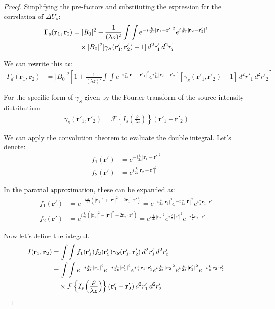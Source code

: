 \documentclass[10pt,a4paper]{amsart}
\begin{document}
\begin{proof}
Simplifying the pre-factors and substituting the expression for the correlation of $\Delta U_s$:
\begin{align}
\Gamma_d(\mathbf{r}_1, \mathbf{r}_2) &= |B_0|^2 + \frac{1}{(\lambda z)^2} \int\int e^{-i\frac{k}{2z}|\mathbf{r}_1 - \mathbf{r}'_1|^2} e^{i\frac{k}{2z}|\mathbf{r}_2 - \mathbf{r}'_2|^2} \\
&\quad \times |B_0|^2 [\gamma_S(\mathbf{r}'_1, \mathbf{r}'_2) - 1] \, d^2r'_1 \, d^2r'_2 \notag
\end{align}

We can rewrite this as:
\begin{align}
\Gamma_d(\mathbf{r}_1, \mathbf{r}_2) &= |B_0|^2 \left[1 + \frac{1}{(\lambda z)^2} \int\int e^{-i\frac{k}{2z}|\mathbf{r}_1 - \mathbf{r}'_1|^2} e^{i\frac{k}{2z}|\mathbf{r}_2 - \mathbf{r}'_2|^2} [\gamma_S(\mathbf{r}'_1, \mathbf{r}'_2) - 1] \, d^2r'_1 \, d^2r'_2 \right]
\end{align}

For the specific form of $\gamma_S$ given by the Fourier transform of the source intensity distribution:
\begin{align}
\gamma_S(\mathbf{r}'_1, \mathbf{r}'_2) = \mathcal{F}\left\{I_s\left(\frac{\mathbf{\rho}}{\lambda z}\right)\right\}(\mathbf{r}'_1 - \mathbf{r}'_2)
\end{align}

We can apply the convolution theorem to evaluate the double integral. Let's denote:
\begin{align}
f_1(\mathbf{r}') &= e^{-i\frac{k}{2z}|\mathbf{r}_1 - \mathbf{r}'|^2} \\
f_2(\mathbf{r}') &= e^{i\frac{k}{2z}|\mathbf{r}_2 - \mathbf{r}'|^2}
\end{align}

In the paraxial approximation, these can be expanded as:
\begin{align}
f_1(\mathbf{r}') &= e^{-i\frac{k}{2z}(|\mathbf{r}_1|^2 + |\mathbf{r}'|^2 - 2\mathbf{r}_1 \cdot \mathbf{r}')} = e^{-i\frac{k}{2z}|\mathbf{r}_1|^2} e^{-i\frac{k}{2z}|\mathbf{r}'|^2} e^{i\frac{k}{z}\mathbf{r}_1 \cdot \mathbf{r}'} \\
f_2(\mathbf{r}') &= e^{i\frac{k}{2z}(|\mathbf{r}_2|^2 + |\mathbf{r}'|^2 - 2\mathbf{r}_2 \cdot \mathbf{r}')} = e^{i\frac{k}{2z}|\mathbf{r}_2|^2} e^{i\frac{k}{2z}|\mathbf{r}'|^2} e^{-i\frac{k}{z}\mathbf{r}_2 \cdot \mathbf{r}'}
\end{align}

Now let's define the integral:
\begin{align}
I(\mathbf{r}_1, \mathbf{r}_2) &= \int\int f_1(\mathbf{r}'_1) f_2(\mathbf{r}'_2) \gamma_S(\mathbf{r}'_1, \mathbf{r}'_2) \, d^2r'_1 \, d^2r'_2 \\
&= \int\int e^{-i\frac{k}{2z}|\mathbf{r}_1|^2} e^{-i\frac{k}{2z}|\mathbf{r}'_1|^2} e^{i\frac{k}{z}\mathbf{r}_1 \cdot \mathbf{r}'_1} e^{i\frac{k}{2z}|\mathbf{r}_2|^2} e^{i\frac{k}{2z}|\mathbf{r}'_2|^2} e^{-i\frac{k}{z}\mathbf{r}_2 \cdot \mathbf{r}'_2} \notag \\
&\quad \times \mathcal{F}\left\{I_s\left(\frac{\mathbf{\rho}}{\lambda z}\right)\right\}(\mathbf{r}'_1 - \mathbf{r}'_2) \, d^2r'_1 \, d^2r'_2 \notag
\end{align}


\end{proof}
\end{document}
